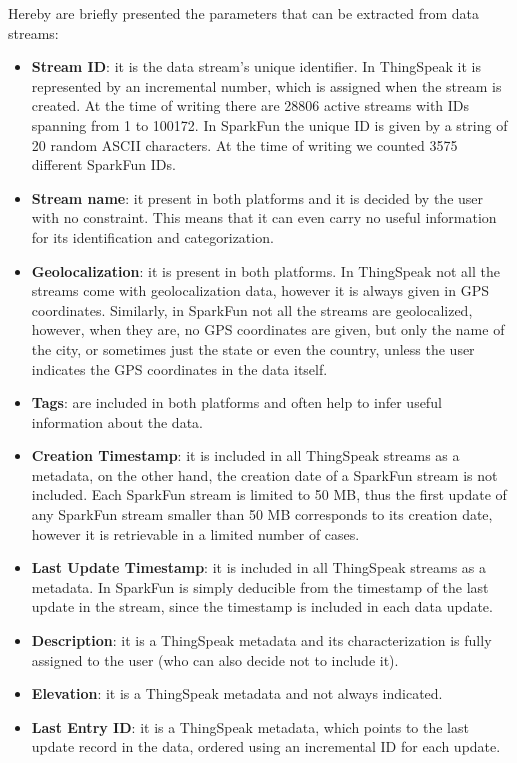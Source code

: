 \documentclass[conference]{IEEEtran}
\begin{document}
Hereby are briefly presented the parameters that can be extracted from data streams:
\begin{itemize}
 \item \textbf{Stream ID}: it is the data stream's unique identifier. In ThingSpeak it is represented by an incremental number, which is assigned when the stream is created. At the time of writing there are 28806 active streams with IDs spanning from 1 to 100172. In SparkFun the unique ID is given by a string of 20 random ASCII characters. At the time of writing we counted 3575 different SparkFun IDs. 
 \item \textbf{Stream name}: it present in both platforms and it is decided by the user with no constraint. This means that it can even carry no useful information for its identification and categorization.
 \item \textbf{Geolocalization}: it is present in both platforms. In ThingSpeak not all the streams come with geolocalization data, however it is always given in GPS coordinates. Similarly, in SparkFun not all the streams are geolocalized, however, when they are, no GPS coordinates are given, but only the name of the city, or sometimes just the state or even the country, unless the user indicates the GPS coordinates in the data itself.
 \item \textbf{Tags}: are included in both platforms and often help to infer useful information about the data.
 \item \textbf{Creation Timestamp}: it is included in all ThingSpeak streams as a metadata, on the other hand, the creation date of a SparkFun stream is not included. Each SparkFun stream is limited to 50 MB, thus the first update of any SparkFun stream smaller than 50 MB corresponds to its creation date,  however it is retrievable in a limited number of cases.
 \item \textbf{Last Update Timestamp}: it is included in all ThingSpeak streams as a metadata. In SparkFun is simply deducible from the timestamp of the last update in the stream, since the timestamp is included in each data update.
 \item \textbf{Description}: it is a ThingSpeak metadata and its characterization is fully assigned to the user (who can also decide not to include it).
 \item \textbf{Elevation}: it is a ThingSpeak metadata and not always indicated.
 \item \textbf{Last Entry ID}: it is a ThingSpeak metadata, which points to the last update record in the data, ordered using an incremental ID for each update.
\end{itemize}
\end{document}
